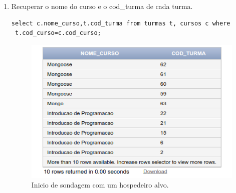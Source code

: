 \documentclass[
article,			%
11pt,				%
oneside,			%
a4paper,			%
english,			%
brazil,				%
sumario=tradicional
]{abntex2}
\begin{document}
\begin{enumerate}
	 	
	 	 	
	 	\item  Recuperar o nome do curso e o cod\_turma de
	 	cada turma.
	 	\begin{verbatim}
select c.nome_curso,t.cod_turma from turmas t, cursos c where
 t.cod_curso=c.cod_curso;
	 	\end{verbatim}
	 	\begin{center}
	 		\begin{figure}[H]
	 			\centering
	 			\includegraphics[scale=0.5]{./at-08.png}
	 			\caption{Inicio de sondagem com um hospedeiro alvo.}
	 			\label{rota-1}
	 		\end{figure}
	 	\end{center}
	 	

\end{enumerate}
\end{document}
